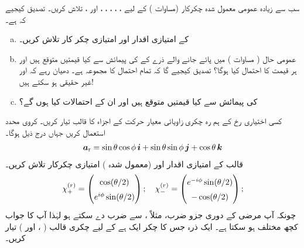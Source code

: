   سب سے زیادہ عمومی معمول شدہ    چکرکار     (مساوات )   کے لیے ،   ،  ،  ،  ، اور   ،
 تلاش کریں۔  تصدیق  کیجیے  کہ     ہے۔ 
 \begin{enumerate}[a.]
\item
     کے امتیازی  اقدار اور امتیازی چکر کار  تلاش  کریں۔
\item
 عمومی حال  ( مساوات  )   میں پائے جانے والے  ذرے کے    کی پیمائش سے کیا قیمتیں متوقع  ہیں اور ہر قیمت کا احتمال کیا ہوگا؟  تصدیق کیجیے  گا کہ تمام احتمال کا مجموعہ    ہے۔  دھیان رہے کہ   اور   غیر حقیقی   ہو سکتے ہیں!  
\item
  کی پیمائش سے کیا قیمتیں متوقع ہیں اور ان کے احتمالات کیا ہوں گے؟ 
\end{enumerate}
کسی اختیاری رخ  کے ہم رہ چکری زاویائی معیار حرکت کے اجزاء کا  قالب    تیار کریں۔ کروی محدد استعمال کریں جہاں درج ذیل ہوگا۔
\begin{align}
{\boldsymbol{a}}_{\textup{r}}= \sin\theta \cos\phi\, {\boldsymbol{i}} + \sin\theta \sin\phi \, {\boldsymbol{j}} + \cos\theta \, {\boldsymbol{k}}
\end{align}
 قالب  کے  امتیازی  اقدار  اور (معمول شدہ  ) امتیازی  چکرکار  تلاش کریں۔ 
\begin{align}
\renewcommand{\arraystretch}{1.5}
\chi_{+}^{(r)} = \begin{pmatrix} \cos(\theta/2)\\ e^{i\phi}\sin(\theta/2)\end{pmatrix};
\quad
\chi_{-}^{(r)} = \begin{pmatrix} e^{-i\phi}\sin(\theta/2)\\ -\cos(\theta/2)\end{pmatrix};
\end{align}
چونکہ آپ  مرضی کے دوری جزو ضرب، مثلاً    ،  سے ضرب دے سکتے ہو لہٰذا   آپ کا جواب کچھ مختلف ہو سکتا ہے۔ 
ایک  ذرہ جس کا چکر ایک  ہے کے لیے چکری  قالب (  ،      اور ) تیار کریں۔     
